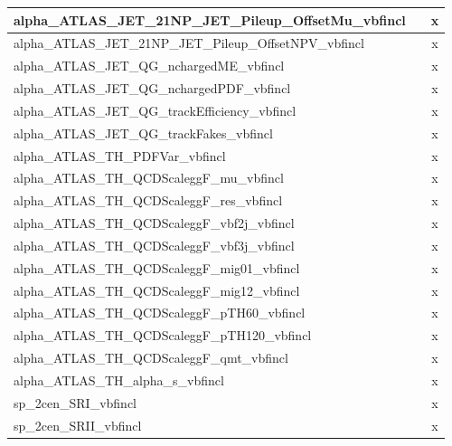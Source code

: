 \begin{table}[htbp]
\begin{tabular}{|l|c|c|}
alpha\_ATLAS\_JET\_21NP\_JET\_Pileup\_OffsetMu\_vbfincl                &      & x       \\ \hline
alpha\_ATLAS\_JET\_21NP\_JET\_Pileup\_OffsetNPV\_vbfincl               &      & x       \\ \hline
alpha\_ATLAS\_JET\_QG\_nchargedME\_vbfincl                             &      & x       \\ \hline
alpha\_ATLAS\_JET\_QG\_nchargedPDF\_vbfincl                            &      & x       \\ \hline
alpha\_ATLAS\_JET\_QG\_trackEfficiency\_vbfincl                        &      & x       \\ \hline
alpha\_ATLAS\_JET\_QG\_trackFakes\_vbfincl                             &      & x       \\ \hline
alpha\_ATLAS\_TH\_PDFVar\_vbfincl                                      &      & x       \\ \hline
alpha\_ATLAS\_TH\_QCDScaleggF\_mu\_vbfincl                                 &      & x       \\ \hline
alpha\_ATLAS\_TH\_QCDScaleggF\_res\_vbfincl                                 &      & x       \\ \hline
alpha\_ATLAS\_TH\_QCDScaleggF\_vbf2j\_vbfincl                                 &      & x       \\ \hline
alpha\_ATLAS\_TH\_QCDScaleggF\_vbf3j\_vbfincl                                 &      & x       \\ \hline
alpha\_ATLAS\_TH\_QCDScaleggF\_mig01\_vbfincl                                 &      & x       \\ \hline
alpha\_ATLAS\_TH\_QCDScaleggF\_mig12\_vbfincl                                 &      & x       \\ \hline
alpha\_ATLAS\_TH\_QCDScaleggF\_pTH60\_vbfincl                                 &      & x       \\ \hline
alpha\_ATLAS\_TH\_QCDScaleggF\_pTH120\_vbfincl                                 &      & x       \\ \hline
alpha\_ATLAS\_TH\_QCDScaleggF\_qmt\_vbfincl                                 &      & x       \\ \hline
alpha\_ATLAS\_TH\_alpha\_s\_vbfincl                                    &      & x       \\ \hline
sp\_2cen\_SRI\_vbfincl                                                 &      & x       \\ \hline
sp\_2cen\_SRII\_vbfincl                                                &      & x       \\ \hline

\end{tabular}
\end{table}
